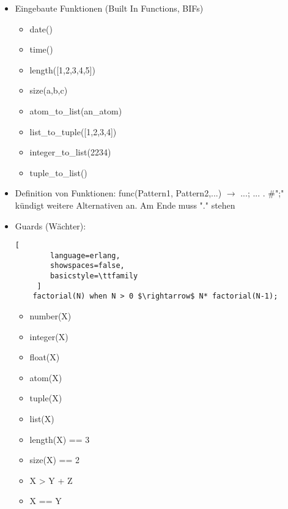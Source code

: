 \documentclass[10pt]{article}
\begin{document}
\begin{itemize}
        \begin{lstlisting}[
        language=erlang,
        showspaces=false,
        basicstyle=\ttfamily
     ]
    -module(demo).
    -export([double/1]).
    double(X) $\rightarrow$ times(X, 2).
    times(X, N) $\rightarrow$ X * N.
    \end{lstlisting}
  \item Eingebaute Funktionen (Built In Functions, BIFs)
        \begin{itemize}
          \item date()
          \item time()
          \item length([1,2,3,4,5])
          \item size({a,b,c})
          \item atom\_to\_list(an\_atom)
          \item list\_to\_tuple([1,2,3,4])
          \item integer\_to\_list(2234)
          \item tuple\_to\_list({})
        \end{itemize}
  \item Definition von Funktionen: func(Pattern1, Pattern2,...) $\rightarrow$ ...; ... . \#";" kündigt weitere Alternativen an. Am Ende muss "." stehen
  \item Guards (Wächter):
        \begin{lstlisting}[
        language=erlang,
        showspaces=false,
        basicstyle=\ttfamily
     ]
    factorial(N) when N > 0 $\rightarrow$ N* factorial(N-1);
    \end{lstlisting}
        \begin{itemize}
          \item number(X)   %
          \item integer(X)  %
          \item float(X)    %
          \item atom(X)     %
          \item tuple(X)    %
          \item list(X)     %
          \item length(X) == 3  %
          \item size(X) == 2    %
          \item X > Y + Z   %
          \item X == Y  %

\end{itemize}
\end{itemize}
\end{document}
